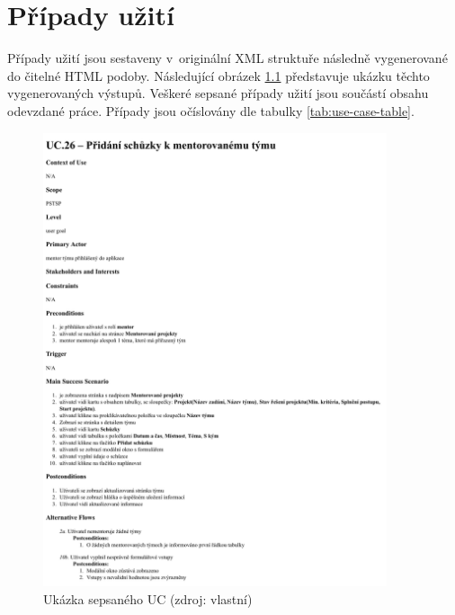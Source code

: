 \documentclass[czech,BP]{thesiskiv}
\begin{document}
{\raggedright\small


\appendix
\chapter{Případy užití}
Případy užití jsou sestaveny v~originální XML struktuře následně vygenerované do čitelné HTML podoby. Následující obrázek \ref{fig:uc_example} představuje ukázku těchto vygenerovaných výstupů. Veškeré sepsané případy užití jsou součástí obsahu odevzdané práce. Případy jsou očíslovány dle tabulky \ref{tab:use-case-table}.

\begin{figure}[H]
	\centering
	\includegraphics[width=0.9\textwidth]{img/use_case/use_case_example}
	\caption{Ukázka sepsaného UC (zdroj: vlastní)}
	\label{fig:uc_example}
\end{figure}

}
\end{document}
